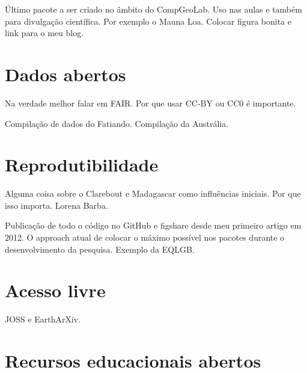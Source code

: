 \documentclass[10pt,a4paper,oneside]{book}
\begin{document}
Último pacote a ser criado no âmbito do CompGeoLab.
Uso nas aulas e também para divulgação científica.
Por exemplo o Mauna Loa.
Colocar figura bonita e link para o meu blog.


\section{Dados abertos}

Na verdade melhor falar em FAIR.
Por que usar CC-BY ou CC0 é importante.

Compilação de dados do Fatiando.
Compilação da Austrália.


\section{Reprodutibilidade}

Alguma coisa sobre o Clarebout e Madagascar como influências iniciais.
Por que isso importa.
Lorena Barba.

Publicação de todo o código no GitHub e figshare desde meu primeiro artigo em
2012.
O approach atual de colocar o máximo possível nos pacotes durante o
desenvolvimento da pesquisa.
Exemplo da EQLGB.

\section{Acesso livre}

JOSS e EarthArXiv.


\section{Recursos educacionais abertos}
\end{document}
